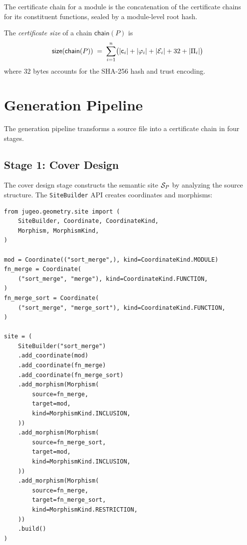 \documentclass[11pt]{article}
\newcommand{\certchain}{\mathsf{chain}}
\newcommand{\certsize}{\mathsf{size}}
\begin{document}
\begin{corollary}\label{cor:module}
The certificate chain for a \Python{} module is the concatenation
of the certificate chains for its constituent functions, sealed by
a module-level root hash.
\end{corollary}

\begin{definition}\label{def:cert-size}
The \emph{certificate size} of a chain $\certchain(P)$ is
\[
  \certsize(\certchain(P)) \;=\; \sum_{i=1}^{n}
    \bigl(|\coord_i| + |\prop_i| + |\evid_i| + 32 + |\prov_i|\bigr)
\]
where $32$ bytes accounts for the SHA-256 hash and trust encoding.
\end{definition}

\section{Generation Pipeline}\label{sec:pipeline}

The \JuGeo{} generation pipeline transforms a \Python{} source file
into a certificate chain in four stages.

\subsection{Stage 1: Cover Design}\label{ssec:cover}

The cover design stage constructs the semantic site $\mathcal{S}_P$ by
analyzing the source structure.  The \texttt{SiteBuilder} API
creates coordinates and morphisms:

\begin{lstlisting}[style=jugeo-python,caption={Cover design for a sorting module.}]
from jugeo.geometry.site import (
    SiteBuilder, Coordinate, CoordinateKind,
    Morphism, MorphismKind,
)

mod = Coordinate(("sort_merge",), kind=CoordinateKind.MODULE)
fn_merge = Coordinate(
    ("sort_merge", "merge"), kind=CoordinateKind.FUNCTION,
)
fn_merge_sort = Coordinate(
    ("sort_merge", "merge_sort"), kind=CoordinateKind.FUNCTION,
)

site = (
    SiteBuilder("sort_merge")
    .add_coordinate(mod)
    .add_coordinate(fn_merge)
    .add_coordinate(fn_merge_sort)
    .add_morphism(Morphism(
        source=fn_merge,
        target=mod,
        kind=MorphismKind.INCLUSION,
    ))
    .add_morphism(Morphism(
        source=fn_merge_sort,
        target=mod,
        kind=MorphismKind.INCLUSION,
    ))
    .add_morphism(Morphism(
        source=fn_merge,
        target=fn_merge_sort,
        kind=MorphismKind.RESTRICTION,
    ))
    .build()
)
\end{lstlisting}
\end{document}
